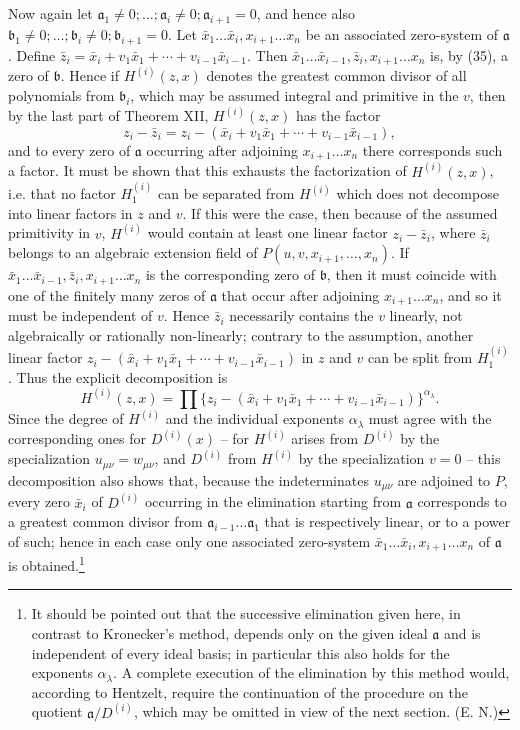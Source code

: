 \documentclass[11pt]{article}
\providecommand{\aideal}{\mathfrak a}
\providecommand{\bideal}{\mathfrak b}
\begin{document}
Now again let $\aideal_1\ne0;
\ldots;\aideal_i\ne0;\aideal_{i+1}=0$, and hence also $\bideal_1\ne0;
\ldots;\bideal_i\ne0;\bideal_{i+1}=0$. Let $\bar x_1\ldots\bar x_i,x_{i+1}\ldots x_n$ be an associated zero-system of $\aideal$. Define $\bar z_i=\bar x_i+v_1\bar x_1+\cdots+v_{i-1}\bar x_{i-1}$. Then $\bar x_1\ldots\bar x_{i-1},\bar z_i,x_{i+1}\ldots x_n$ is, by (35), a zero of $\bideal$. Hence if $H^{(i)}(z,x)$ denotes the greatest common divisor of all polynomials from $\bideal_i$, which may be assumed integral and primitive in the $v$, then by the last part of Theorem XII, $H^{(i)}(z,x)$ has the factor
\[
 z_i-\bar z_i=z_i-(\bar x_i+v_1\bar x_1+\cdots+v_{i-1}\bar x_{i-1}),
\]
and to every zero of $\aideal$ occurring after adjoining $x_{i+1}\ldots x_n$ there corresponds such a factor. It must be shown that this exhausts the factorization of $H^{(i)}(z,x)$, i.e. that no factor $H^{(i)}_1$ can be separated from $H^{(i)}$ which does not decompose into linear factors in $z$ and $v$. If this were the case, then because of the assumed primitivity in $v$, $H^{(i)}$ would contain at least one linear factor $z_i-\bar z_i$, where $\bar z_i$ belongs to an algebraic extension field of $P(u,v,x_{i+1},
\ldots,x_n)$. If $\bar x_1\ldots\bar x_{i-1},\bar z_i,x_{i+1}\ldots x_n$ is the corresponding zero of $\bideal$, then it must coincide with one of the finitely many zeros of $\aideal$ that occur after adjoining $x_{i+1}\ldots x_n$, and so it must be independent of $v$. Hence $\bar z_i$ necessarily contains the $v$ linearly, not algebraically or rationally non-linearly; contrary to the assumption, another linear factor $z_i-(\bar x_i+v_1\bar x_1+\cdots+v_{i-1}\bar x_{i-1})$ in $z$ and $v$ can be split from $H^{(i)}_1$. Thus the explicit decomposition is
\[
 H^{(i)}(z,x)=\prod \{z_i-(\bar x_i+v_1\bar x_1+\cdots+v_{i-1}\bar x_{i-1})\}^{\alpha_\lambda}.
\]
Since the degree of $H^{(i)}$ and the individual exponents $\alpha_\lambda$ must agree with the corresponding ones for $D^{(i)}(x)$ -- for $H^{(i)}$ arises from $D^{(i)}$ by the specialization $u_{\mu\nu}=w_{\mu\nu}$, and $D^{(i)}$ from $H^{(i)}$ by the specialization $v=0$ -- this decomposition also shows that, because the indeterminates $u_{\mu\nu}$ are adjoined to $P$, every zero $\bar x_i$ of $D^{(i)}$ occurring in the elimination starting from $\aideal$ corresponds to a greatest common divisor from $\aideal_{i-1}\ldots\aideal_1$ that is respectively linear, or to a power of such; hence in each case only one associated zero-system $\bar x_1\ldots\bar x_i,x_{i+1}\ldots x_n$ of $\aideal$ is obtained.\footnote{It should be pointed out that the successive elimination given here, in contrast to Kronecker's method, depends only on the given ideal $\aideal$ and is independent of every ideal basis; in particular this also holds for the exponents $\alpha_\lambda$. A complete execution of the elimination by this method would, according to Hentzelt, require the continuation of the procedure on the quotient $\aideal/D^{(i)}$, which may be omitted in view of the next section. (E. N.)}
\end{document}

